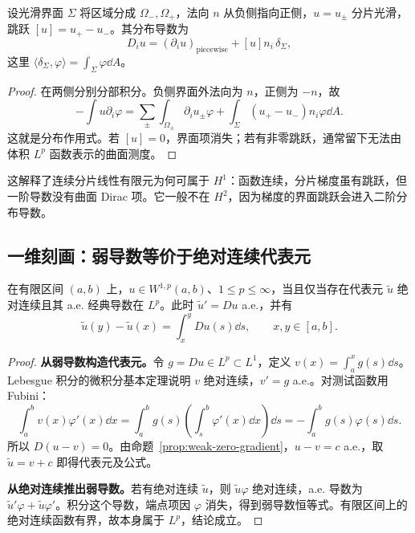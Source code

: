 \begin{proposition}[分片光滑函数的界面项]\label{prop:weak-interface}
设光滑界面 $\Sigma$ 将区域分成 $\Omega_-,\Omega_+$，法向 $n$ 从负侧指向正侧，$u=u_\pm$ 分片光滑，跳跃 $[u]=u_+-u_-$。其分布导数为
\begin{equation}
 D_i u=(\partial_i u)_{\mathrm{piecewise}}+[u]n_i\,\delta_\Sigma,
 \label{eq:weak-interface}
\end{equation}
这里 $\langle\delta_\Sigma,\varphi\rangle=\int_\Sigma\varphi\dd A$。
\end{proposition}
\begin{proof}
在两侧分别分部积分。负侧界面外法向为 $n$，正侧为 $-n$，故
\[
 -\int u\partial_i\varphi
 =\sum_{\pm}\int_{\Omega_\pm}\partial_i u_\pm\varphi
   +\int_\Sigma(u_+-u_-)n_i\varphi\dd A.
\]
这就是分布作用式。若 $[u]=0$，界面项消失；若有非零跳跃，通常留下无法由体积 $L^p$ 函数表示的曲面测度。
\end{proof}
这解释了连续分片线性有限元为何可属于 $H^1$：函数连续，分片梯度虽有跳跃，但一阶导数没有曲面 Dirac 项。它一般不在 $H^2$，因为梯度的界面跳跃会进入二阶分布导数。

\subsection{一维刻画：弱导数等价于绝对连续代表元}\label{subsec:weak-ac}

\begin{theorem}\label{thm:weak-ac}
在有限区间 $(a,b)$ 上，$u\in W^{1,p}(a,b)$、$1\le p\le\infty$，当且仅当存在代表元 $\widetilde u$ 绝对连续且其 a.e. 经典导数在 $L^p$。此时 $\widetilde u'=Du$ a.e.，并有
\begin{equation}
 \widetilde u(y)-\widetilde u(x)=\int_x^yDu(s)\dd s,
 \qquad x,y\in[a,b].
 \label{eq:weak-ac-ftc}
\end{equation}
\end{theorem}
\begin{proof}
\textbf{从弱导数构造代表元。}令 $g=Du\in L^p\subset L^1$，定义 $v(x)=\int_a^xg(s)\dd s$。Lebesgue 积分的微积分基本定理说明 $v$ 绝对连续，$v'=g$ a.e.。对测试函数用 Fubini：
\[
 \int_a^bv(x)\varphi'(x)\dd x
 =\int_a^bg(s)\left(\int_s^b\varphi'(x)\dd x\right)\dd s
 =-\int_a^bg(s)\varphi(s)\dd s.
\]
所以 $D(u-v)=0$。由命题~\ref{prop:weak-zero-gradient}，$u-v=c$ a.e.，取 $\widetilde u=v+c$ 即得代表元及公式。

\textbf{从绝对连续推出弱导数。}若有绝对连续 $\widetilde u$，则 $\widetilde u\varphi$ 绝对连续，a.e. 导数为 $\widetilde u'\varphi+\widetilde u\varphi'$。积分这个导数，端点项因 $\varphi$ 消失，得到弱导数恒等式。有限区间上的绝对连续函数有界，故本身属于 $L^p$，结论成立。
\end{proof}


